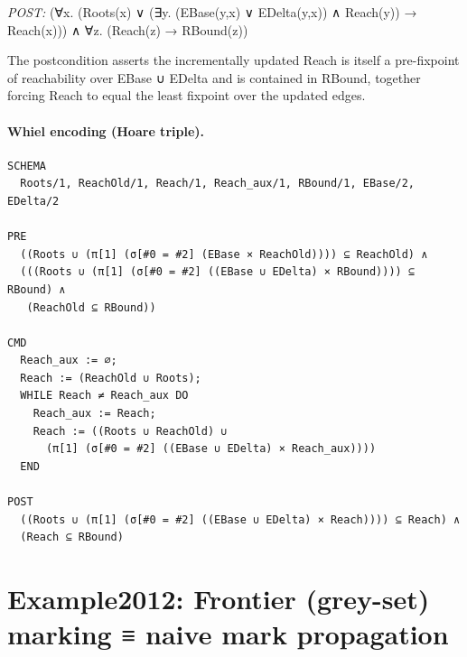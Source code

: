 \documentclass[10pt]{article}
\begin{document}
\textit{POST:} (∀x. (Roots(x) ∨ (∃y. (EBase(y,x) ∨ EDelta(y,x)) ∧ Reach(y)) → Reach(x))) ∧ ∀z. (Reach(z) → RBound(z))\par The postcondition asserts the incrementally updated Reach is itself a pre-fixpoint of reachability over EBase ∪ EDelta and is contained in RBound, together forcing Reach to equal the least fixpoint over the updated edges.

\paragraph{Whiel encoding (Hoare triple).}

\begin{Verbatim}[fontsize=\scriptsize,breaklines=true,breakanywhere=true,frame=single,framesep=1.5mm]
SCHEMA
  Roots/1, ReachOld/1, Reach/1, Reach_aux/1, RBound/1, EBase/2, EDelta/2

PRE
  ((Roots ∪ (π[1] (σ[#0 = #2] (EBase × ReachOld)))) ⊆ ReachOld) ∧
  (((Roots ∪ (π[1] (σ[#0 = #2] ((EBase ∪ EDelta) × RBound)))) ⊆ RBound) ∧
   (ReachOld ⊆ RBound))

CMD
  Reach_aux := ∅;
  Reach := (ReachOld ∪ Roots);
  WHILE Reach ≠ Reach_aux DO
    Reach_aux := Reach;
    Reach := ((Roots ∪ ReachOld) ∪
      (π[1] (σ[#0 = #2] ((EBase ∪ EDelta) × Reach_aux))))
  END

POST
  ((Roots ∪ (π[1] (σ[#0 = #2] ((EBase ∪ EDelta) × Reach)))) ⊆ Reach) ∧
  (Reach ⊆ RBound)
\end{Verbatim}

\Needspace{0.45\textheight}

\section{Example2012: Frontier (grey-set) marking ≡ naive mark propagation}\label{case:Example2012}
\end{document}
